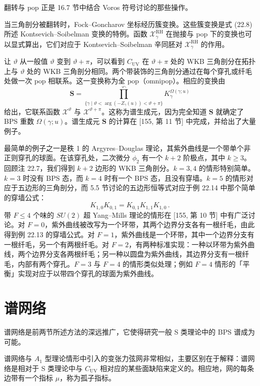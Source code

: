 \begin{remark}[22.15]
翻转与 pop 正是 16.7 节中结合 Voros 符号讨论的那些操作。
\end{remark}

当三角剖分被翻转时，Fock–Goncharov 坐标经历簇变换。这些簇变换是式 (22.8) 所述 Kontsevich–Soibelman 变换的特例。函数 $\mathcal{X}^{\mathrm{RH}}_\gamma$ 在抛接与 pop 下的变换也可以显式算出，它们对应于 Kontsevich–Soibelman 辛同胚对 $\mathcal{X}^{\mathrm{RH}}_\gamma$ 的作用。

让 $\vartheta$ 从一般值 $\vartheta$ 变到 $\vartheta+\pi$，可以看到 $C_{\mathrm{UV}}$ 在 $\vartheta+\pi$ 处的 WKB 三角剖分在拓扑上与 $\vartheta$ 处的 WKB 三角剖分相同。两个带装饰的三角剖分通过在每个穿孔或纤毛处做一次 pop 相联系。这一变换称为全 pop（omnipop）。相应的变换由
\[
\mathbf{S}=\overset{\curvearrowleft}{\prod_{\{\gamma\mid \vartheta<\arg(-Z_\gamma(u))<\vartheta+\pi\}}}K_\gamma^{\Omega(\gamma;u)}
\]
给出，它联系函数 $\mathcal{X}^\vartheta$ 与 $\mathcal{X}^{\vartheta+\pi}$。这称为谱生成元，因为完全知道 $\mathbf{S}$ 就确定了 BPS 重数 $\Omega(\gamma;u)$。谱生成元 $\mathbf{S}$ 的计算在 [155, 第 11 节] 中完成，并给出了大量例子。

最简单的例子之一是秩 1 的 Argyres–Douglas 理论，其紫外曲线是一个带单个非正则穿孔的球面。在该穿孔处，二次微分 $\phi_2$ 有一个 $k+2$ 阶极点，其中 $k\ge3$。回顾注 22.7，我们得到 $k+2$ 边形的 WKB 三角剖分。$k=3,4$ 的情形特别简单。$k=3$ 时没有 BPS 态，而 $k=4$ 时有一个 BPS 态，且没有穿墙。$k=5$ 的情形对应于五边形的三角剖分，而 5.5 节讨论的五边形恒等式对应于例 22.14 中那个简单的穿墙公式：
\[
K_{1,0}K_{0,1}=K_{0,1}K_{1,1}K_{1,0}\,.
\]
带 $F\le4$ 个味的 $SU(2)$ 超 Yang–Mills 理论的情形在 [155, 第 10 节] 中有广泛讨论。对 $F=0$，紫外曲线被改写为一个环带，其两个边界分支各有一根纤毛，由此得到例 22.13 的穿墙公式。对 $F=1$，紫外曲线是一个环带，其中一个边界分支有一根纤毛，另一个有两根纤毛。对 $F=2$，有两种标准实现：一种以环带为紫外曲线，两个边界分支各两根纤毛；另一种以圆盘为紫外曲线，其边界分支有一根纤毛，内部有两个穿孔。$F=3$ 与 $F=4$ 的情形类似处理；例如 $F=4$ 情形的「平衡」实现对应于以带四个穿孔的球面为紫外曲线。

\section{谱网络}

谱网络是前两节所述方法的深远推广，它使得研究一般 S 类理论中的 BPS 谱成为可能。

谱网络与 $A_1$ 型理论情形中引入的变张力弦网非常相似，主要区别在于解释：谱网络是相对于 S 类理论中与 $C_{\mathrm{UV}}$ 相对应的某些面缺陷来定义的。相应地，网的每条边带有一个指标 $\mu$，称为孤子指标。

